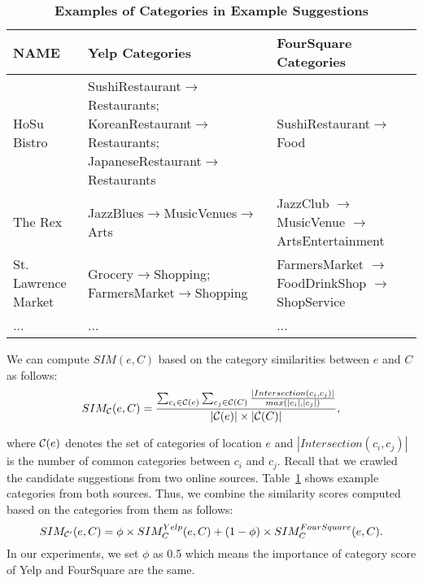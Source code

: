 \begin{table}[t]
\begin{center}
\caption{\textbf{Examples of Categories in Example Suggestions}}\label{tb:category_example}
\begin{tabular}{ | l | p{5cm} | p{4cm} |}
\hline
\textbf{NAME} & \textbf{Yelp Categories} & \textbf{FourSquare Categories}\\ 
\hline
\hline
HoSu Bistro & SushiRestaurant$\to$Restaurants;
             KoreanRestaurant$\to$Restaurants;
            JapaneseRestaurant$\to$Restaurants
            & SushiRestaurant$\to$Food \\ 
\hline
The Rex & JazzBlues$\to$MusicVenues$\to$Arts 
        & JazzClub $\to$ MusicVenue $\to$ ArtsEntertainment\\ 
\hline
St. Lawrence Market & Grocery$\to$Shopping;
                    FarmersMarket$\to$Shopping 
        & FarmersMarket $\to$ FoodDrinkShop $\to$ ShopService\\ 
\hline
... & ... & ...\\
\hline
\end{tabular}
\vspace{-5mm}
\end{center}
\end{table}

We can compute $SIM(e,C)$ based on the category similarities between 
$e$ and $C$ as follows: 
\begin{equation}
SIM_{\cal C}(e,C) = \frac{ \sum_{c_i \in {\cal C}(e)} \sum_{c_j \in {\cal C}(C)} \frac{|Intersection(c_i,c_j)|}{max(|c_i|,|c_j|)}}{|{\cal C}(e)| \times |{\cal C}(C)|}, 
\label{eq:simc}
\end{equation}

where
${\cal C}(e)$ denotes the set of categories of location $e$ and
$|Intersection(c_i,c_j)|$ is the number of common categories 
between $c_i$ and $c_j$. 
Recall that we crawled the candidate suggestions from two online 
sources. Table~\ref{tb:category_example} shows example categories 
from both sources. Thus, we combine the similarity scores computed 
based on the categories from them as follows: 
\begin{equation}
    SIM_{{\cal C}'}(e,C) = \phi \times SIM_C^{Yelp}(e,C) + (1-\phi) \times SIM_C^{FourSquare}(e,C). 
\label{eq:3}
\end{equation} 
In our experiments, we set $\phi$ as 0.5 
which means the importance of category score of Yelp and 
FourSquare are the same.


